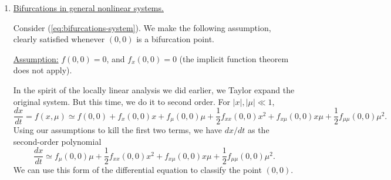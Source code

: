 \documentclass[11pt, letterpaper, oneside]{article}     %
\numberwithin{equation}{subsection}
\theoremstyle{definition}
\numberwithin{theorem}{section}
\theoremstyle{remark}
\begin{document}
\begin{enumerate}
  \medskip

\item \underline{Bifurcations in general nonlinear systems.}

  Consider (\ref{eq:bifurcations-system}). We make the following assumption, clearly satisfied whenever $(0,0)$ is a bifurcation point.

  \underline{Assumption:} $f(0,0) = 0$, and $f_x(0,0) = 0$ (the implicit function theorem does not apply).

  In the spirit of the locally linear analysis we did earlier, we Taylor expand the original system. But this time, we do it to second order. For $|x|,|\mu| \ll 1$,
  \begin{equation}
    \frac{dx}{dt} = f(x,\mu) \simeq f(0,0) + f_x(0,0)x + f_\mu(0,0)\mu + \frac{1}{2}f_{xx}(0,0)x^2 + f_{x\mu}(0,0)x\mu + \frac{1}{2}f_{\mu\mu}(0,0)\mu^2.
  \end{equation}
  Using our assumptions to kill the first two terms, we have $dx/dt$ as the second-order polynomial
  \begin{equation}
    \frac{dx}{dt} \simeq f_\mu(0,0)\mu + \frac{1}{2}f_{xx}(0,0)x^2 + f_{x\mu}(0,0)x\mu + \frac{1}{2}f_{\mu\mu}(0,0)\mu^2.
  \end{equation}
  We can use this form of the differential equation to classify the point $(0,0)$.


\end{enumerate}
\end{document}
